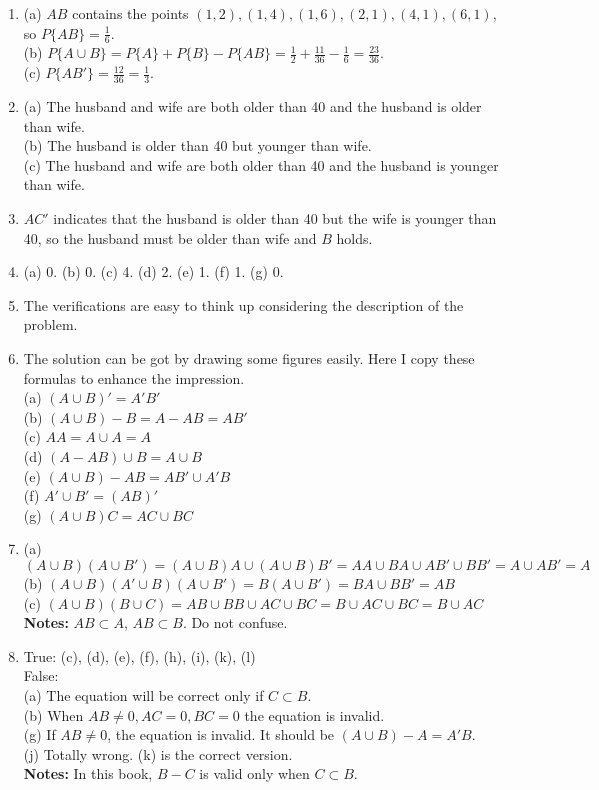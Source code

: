 \documentclass{article}
\numberwithin{equation}{subsection}
\begin{document}
\begin{enumerate}
			\item (a) $AB$ contains the points $(1,2), (1,4), (1,6), (2,1), (4,1), (6,1)$, so $P\{AB\} = \frac{1}{6}$. \\ (b) $P\{A \cup B\} = P\{A\} + P\{B\} - P\{AB\} = \frac{1}{2} + \frac{11}{36} - \frac{1}{6} = \frac{23}{36}$. \\ (c) $P\{AB'\} = \frac{12}{36} = \frac{1}{3}$.
			\item (a) The husband and wife are both older than 40 and the husband is older than wife. \\ (b) The husband is older than 40 but younger than wife. \\ (c) The husband and wife are both older than 40 and the husband is younger than wife.
			\item $AC'$ indicates that the husband is older than 40 but the wife is younger than 40, so the husband must be older than wife and $B$ holds.
			\item (a) 0. (b) 0. (c) 4. (d) 2. (e) 1. (f) 1. (g) 0.
			\item The verifications are easy to think up considering the description of the problem.
			\item The solution can be got by drawing some figures easily. Here I copy these formulas to enhance the impression. \\ (a) $(A\cup B)' = A'B'$ \\ (b) $(A\cup B)-B = A-AB = AB'$ \\ (c) $AA = A\cup A = A$ \\ (d) $(A-AB)\cup B = A \cup B$ \\ (e) $(A\cup B) - AB = AB' \cup A'B$ \\ (f) $A'\cup B' = (AB)'$ \\ (g) $(A\cup B)C = AC\cup BC$
			\item (a) $(A\cup B)(A\cup B') =(A\cup B)A \cup (A\cup B)B'=AA\cup BA\cup AB' \cup BB' = A \cup AB' = A$ \\ (b) $(A\cup B)(A'\cup B)(A\cup B') = B(A\cup B') = BA \cup BB' = AB$ \\ (c) $(A\cup B)(B\cup C) = AB \cup BB\cup AC\cup BC = B\cup AC\cup BC = B \cup AC$ \\ \textbf{Notes: } $AB \subset A $, $AB \subset B$. Do not confuse.
			\item True: (c), (d), (e), (f), (h), (i), (k), (l)\\ False: \\ (a) The equation will be correct only if $C\subset B$. \\ (b) When $AB \not= 0, AC = 0, BC = 0$ the equation is invalid. \\  (g) If $AB\not=0$, the equation is invalid. It should be $(A\cup B)-A = A'B$. \\ (j) Totally wrong. (k) is the correct version. \\ \textbf{Notes: } In this book, $B-C$ is valid only when $C \subset B$.

\end{enumerate}
\end{document}
